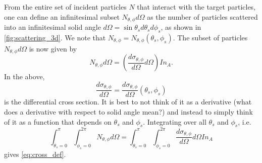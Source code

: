 \documentclass[a4paper,11pt]{report}
\begin{document}
From the entire set of incident particles $N$ that interact with the target particles, one can define an infinitesimal subset $N_{\theta,\phi} d\Omega$ as the number of particles scattered into an infinitesimal solid angle $d\Omega = \sin \theta_s d\theta_s d\phi_s$, as shown in \cref{fig:scattering_3d}. We note that $N_{\theta,\phi} = N_{\theta,\phi} (\theta_s, \phi_s)$. The subset of particles $N_{\theta, \phi} d\Omega$ is now given by
\begin{equation}
    \label{eq:cross_def_diff}
    N_{\theta, \phi} d\Omega = \left ( \frac{d\sigma_{\theta,\phi}}{d\Omega} d\Omega \right ) I n_A.
\end{equation}
In the above, 
\begin{equation}
    \frac{d\sigma_{\theta,\phi}}{d\Omega} = \frac{d\sigma_{\theta,\phi}}{d\Omega}(\theta_s,\phi_s)
\end{equation}
is the differential cross section. It is best to not think of it as a derivative (what does a derivative with respect to solid angle mean?) and instead to simply think of it as a function that depends on $\theta_s$ and $\phi_s$. Integrating over all $\theta_s$ and $\phi_s$, i.e.
\begin{equation}
    \int_{\theta_s = 0}^\pi \int_{\phi_s = 0}^{2\pi} N_{\theta, \phi} d\Omega = \int_{\theta_s = 0}^\pi \int_{\phi_s = 0}^{2\pi} \frac{d\sigma_{\theta,\phi}}{d\Omega}  d\Omega I n_A
\end{equation}
gives \cref{eq:cross_def}.
\end{document}
